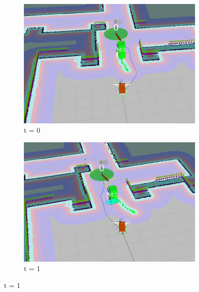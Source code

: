 \begin{figure}[H]
  \centering
  \begin{subfigure}{\linewidth}
    \centering
    \includegraphics[keepaspectratio, scale=0.28]{images/seq-19.png}
    \caption{t = 0}
    \label{Fig:seq-19}
  \end{subfigure}
  
  
  \begin{subfigure}{\linewidth}
    \centering
    \includegraphics[keepaspectratio, scale=0.28]{images/seq-20.png}
    \caption{t = 1}
    \label{Fig:seq-20}
  \end{subfigure}
  
  

\end{figure}

